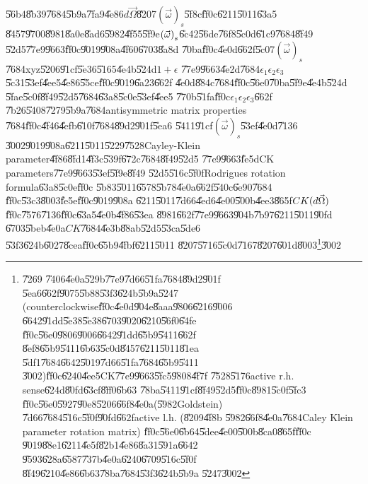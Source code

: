 \documentclass[12pt,a4paper]{article}
\begin{document}
\U{56b4}\U{8b39}\U{7684}\U{5b9a}\U{7fa9}\U{4e86}$d\vec{\Omega}$\U{8207}$%
\left( \vec{\omega}\right) _{s}$\U{5f8c}\U{ff0c}\U{6211}\U{5011}\U{63a5}%
\U{8457}\U{9700}\U{8981}\U{8a0e}\U{8ad6}\U{5982}\U{4f55}\U{5f9e}$\left( \vec{%
\omega}\right) _{s}$\U{6c42}\U{56de}\U{76f8}\U{5c0d}\U{61c9}\U{7684}\U{8f49}%
\U{52d5}\U{77e9}\U{9663}\U{ff0c}\U{9019}\U{908a}\U{4f60}\U{6703}\U{8a8d}%
\U{70ba}\U{ff0c}\U{4e0d}\U{662f}\U{5c07}$\left( \vec{\omega}\right) _{s}$%
\U{7684}xyz\U{5206}\U{91cf}\U{5e36}\U{5165}\U{4e4b}\U{524d}$1+\epsilon $%
\U{77e9}\U{9663}\U{4e2d}\U{7684}$\epsilon _{1}\epsilon _{2}\epsilon _{3}$%
\U{5c31}\U{53ef}\U{4ee5}\U{4e86}\U{55ce}\U{ff0c}\U{9019}\U{6a23}\U{662f}%
\U{4e0d}\U{884c}\U{7684}\U{ff0c}\U{56e0}\U{70ba}\U{5f9e}\U{4e4b}\U{524d}%
\U{5fae}\U{5c0f}\U{8f49}\U{52d5}\U{7684}\U{63a8}\U{5c0e}\U{53ef}\U{4ee5}%
\U{770b}\U{51fa}\U{ff0c}$\epsilon _{1}\epsilon _{2}\epsilon _{3}$\U{662f}%
\U{7b26}\U{5408}\U{7279}\U{5b9a}\U{7684}antisymmetric matrix properties%
\U{7684}\U{ff0c}\U{4f46}\U{4efb}\U{610f}\U{7684}\U{89d2}\U{901f}\U{5ea6}%
\U{5411}\U{91cf}$\left( \vec{\omega}\right) _{s}$\U{53ef}\U{4e0d}\U{7136}%
\U{3002}\U{9019}\U{908a}\U{6211}\U{5011}\U{5229}\U{7528}Cayley-Klein
parameter\U{4f86}\U{8fd1}\U{4f3c}\U{539f}\U{672c}\U{7684}\U{8f49}\U{52d5}%
\U{77e9}\U{9663}\U{fe5d}CK parameters\U{77e9}\U{9663}\U{53ef}\U{5f9e}\U{8f49}%
\U{52d5}\U{516c}\U{5f0f}Rodrigues rotation formula\U{63a8}\U{5c0e}\U{ff0c}%
\U{5b83}\U{5011}\U{6578}\U{5b78}\U{4e0a}\U{662f}\U{540c}\U{6e90}\U{7684}%
\U{ff0c}\U{53c3}\U{8003}\cite{goldstein}\U{fe5e}\U{ff0c}\U{9019}\U{908a}%
\U{6211}\U{5011}\U{7d66}\U{4ed6}\U{4e00}\U{500b}\U{4ee3}\U{865f}$CK(d\vec{%
\Omega})$\U{ff0c}\U{7576}\U{7136}\U{ff0c}\U{63a5}\U{4e0b}\U{4f86}\U{53ea}%
\U{8981}\U{662f}\U{77e9}\U{9663}\U{904b}\U{7b97}\U{6211}\U{5011}\U{90fd}%
\U{6703}\U{5beb}\U{4e0a}$CK$\U{7684}\U{4e3b}\U{88ab}\U{52d5}\U{53ca}\U{5de6}%
\U{53f3}\U{624b}\U{6027}\U{8cea}\U{ff0c}\U{65b9}\U{4fbf}\U{6211}\U{5011}%
\U{8207}\U{5716}\U{5c0d}\U{7167}\U{8207}\U{601d}\U{8003}\footnote{\U{7269}%
\U{7406}\U{4e0a}\U{529b}\U{77e9}\U{7d66}\U{51fa}\U{7684}\U{89d2}\U{901f}%
\U{5ea6}\U{662f}\U{9075}\U{5b88}\U{53f3}\U{624b}\U{5b9a}\U{5247}%
(counterclockwise\U{ff0c}\U{4e0d}\U{904e}\U{8aaa}\U{9806}\U{6216}\U{9006}%
\U{6642}\U{91dd}\U{5e38}\U{5e38}\U{6703}\U{9020}\U{6210}\U{56f0}\U{64fe}%
\U{ff0c}\U{56e0}\U{9806}\U{9006}\U{6642}\U{91dd}\U{65b9}\U{5411}\U{662f}%
\U{8ef8}\U{65b9}\U{5411}\U{6b63}\U{5c0d}\U{8457}\U{6211}\U{5011}\U{81ea}%
\U{5df1}\U{7684}\U{6642}\U{5019}\U{7d66}\U{51fa}\U{7684}\U{65b9}\U{5411}%
\U{3002})\U{ff0c}\U{6240}\U{4ee5}CK\U{77e9}\U{9663}\U{5fc5}\U{9808}\U{4f7f}%
\U{7528}\U{5176}active r.h. sense\U{624d}\U{80fd}\U{63cf}\U{8ff0}\U{6b63}%
\U{78ba}\U{5411}\U{91cf}\U{8f49}\U{52d5}\U{ff0c}\U{8981}\U{5c0f}\U{5fc3}%
\U{ff0c}\U{56e0}\U{5927}\U{90e8}\U{5206}\U{66f8}\U{4e0a}(\U{5982}Goldstein)%
\U{7d66}\U{7684}\U{516c}\U{5f0f}\U{90fd}\U{662f}active l.h. (\U{8209}\U{4f8b}%
\U{5982}\U{66f8}\U{4e0a}\U{7684}Caley Klein parameter rotation matrix)%
\U{ff0c}\U{56e0}\U{6b64}\U{5dee}\U{4e00}\U{500b}\U{8ca0}\U{865f}\U{ff0c}%
\U{9019}\U{88e1}\U{6211}\U{4e5f}\U{82b1}\U{4e86}\U{8a31}\U{591a}\U{6642}%
\U{9593}\U{628a}\U{6587}\U{737b}\U{4e0a}\U{6240}\U{6709}\U{516c}\U{5f0f}%
\U{8f49}\U{6210}\U{4e86}\U{6b63}\U{78ba}\U{7684}\U{53f3}\U{624b}\U{5b9a}%
\U{5247}\U{3002}}\U{3002}%
\end{document}
